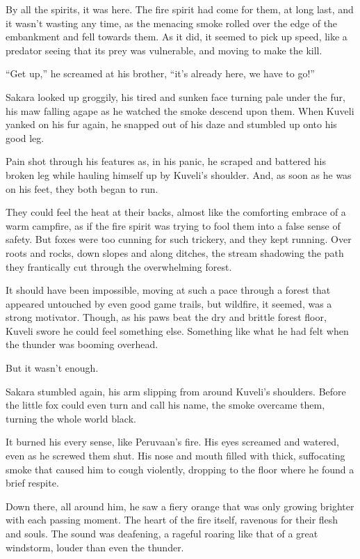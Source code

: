 By all the spirits, it was here. The fire spirit had come for them, at long last, and it wasn't wasting any time, as the menacing smoke rolled over the edge of the embankment and fell towards them. As it did, it seemed to pick up speed, like a predator seeing that its prey was vulnerable, and moving to make the kill.

``Get up,'' he screamed at his brother, ``it's already here, we have to go!''

Sakara looked up groggily, his tired and sunken face turning pale under the fur, his maw falling agape as he watched the smoke descend upon them. When Kuveli yanked on his fur again, he snapped out of his daze and stumbled up onto his good leg.

Pain shot through his features as, in his panic, he scraped and battered his broken leg while hauling himself up by Kuveli's shoulder. And, as soon as he was on his feet, they both began to run.

They could feel the heat at their backs, almost like the comforting embrace of a warm campfire, as if the fire spirit was trying to fool them into a false sense of safety. But foxes were too cunning for such trickery, and they kept running. Over roots and rocks, down slopes and along ditches, the stream shadowing the path they frantically cut through the overwhelming forest.

It should have been impossible, moving at such a pace through a forest that appeared untouched by even good game trails, but wildfire, it seemed, was a strong motivator. Though, as his paws beat the dry and brittle forest floor, Kuveli swore he could feel something else. Something like what he had felt when the thunder was booming overhead.

But it wasn't enough.

Sakara stumbled again, his arm slipping from around Kuveli's shoulders. Before the little fox could even turn and call his name, the smoke overcame them, turning the whole world black.

It burned his every sense, like Peruvaan's fire. His eyes screamed and watered, even as he screwed them shut. His nose and mouth filled with thick, suffocating smoke that caused him to cough violently, dropping to the floor where he found a brief respite.

Down there, all around him, he saw a fiery orange that was only growing brighter with each passing moment. The heart of the fire itself, ravenous for their flesh and souls. The sound was deafening, a rageful roaring like that of a great windstorm, louder than even the thunder.

